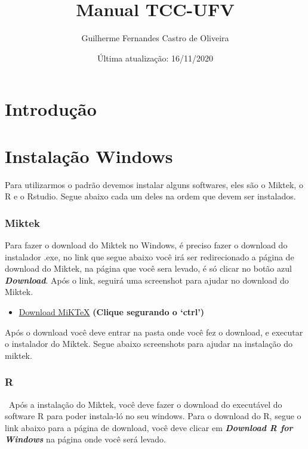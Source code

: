 \documentclass[
]{article}
\title{Manual TCC-UFV}
\author{Guilherme Fernandes Castro de Oliveira}
\date{Última atualização: 16/11/2020}
\providecommand{\tightlist}{%
  \setlength{\itemsep}{0pt}\setlength{\parskip}{0pt}}
\begin{document}
\maketitle

{
\setcounter{tocdepth}{2}
\tableofcontents
}
\hypertarget{introduuxe7uxe3o}{%
\section*{Introdução}\label{introduuxe7uxe3o}}

\hypertarget{instalauxe7uxe3o-windows}{%
\section{Instalação Windows}\label{instalauxe7uxe3o-windows}}

Para utilizarmos o padrão devemos instalar alguns softwares, eles são o Miktek, o R e o Rstudio. Segue abaixo cada um deles na ordem que devem ser instalados.

\hypertarget{miktek}{%
\subsubsection{Miktek}\label{miktek}}

Para fazer o download do Miktek no Windows, é preciso fazer o download do instalador .exe, no link que segue abaixo você irá ser redirecionado a página de download do Miktek, na página que você sera levado, é só clicar no botão azul \textbf{\emph{Download}}. Após o link, seguirá uma screenshot para ajudar no download do Miktek.

\begin{itemize}
\tightlist
\item
  \href{https://miktex.org/download}{Download MiKTeX} \textbf{(Clique segurando o `ctrl')}
\end{itemize}

Após o download você deve entrar na pasta onde você fez o download, e executar o instalador do Miktek. Segue abaixo screenshots para ajudar na instalação do miktek.

\hypertarget{r}{%
\subsubsection{R}\label{r}}

~Após a instalação do Miktek, você deve fazer o download do executável do software R para poder instala-ló no seu windows. Para o download do R, segue o link abaixo para a página de download, você deve clicar em \textbf{\emph{Download R for Windows}} na página onde você será levado.
\end{document}
